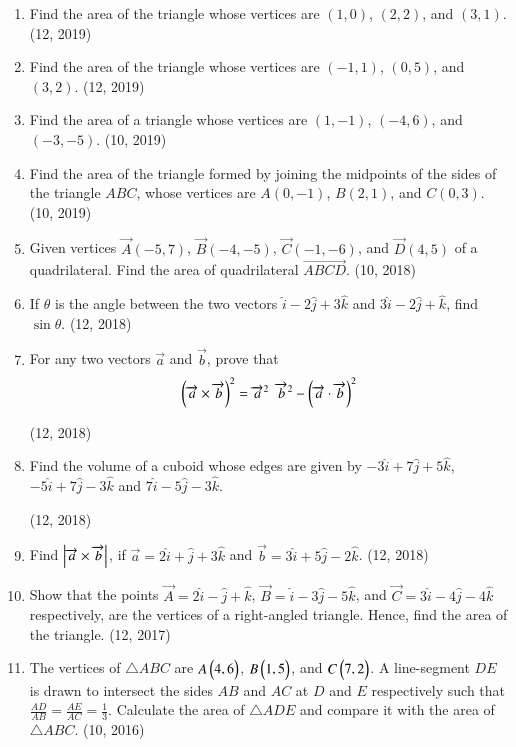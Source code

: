 \begin{enumerate}[label=\thesubsection.\arabic*,ref=\thesubsection.\theenumi]
	\item Find the area of the triangle whose vertices are $(1, 0)$, $(2, 2)$, and $(3, 1)$. \hfill (12, 2019)
	\item Find the area of the triangle whose vertices are $(-1, 1)$, $(0, 5)$, and $(3, 2)$. \hfill (12, 2019)
\item Find the area of a triangle whose vertices are $(1, -1)$, $(-4, 6)$, and $(-3, -5)$. \hfill (10, 2019)
\item Find the area of the triangle formed by joining the midpoints of the sides of the triangle $ABC$, whose vertices are $A(0, -1)$, $B(2, 1)$, and $C(0, 3)$. \hfill (10, 2019)
    \item Given vertices $\vec{A}(-5,7)$, $\vec{B}(-4,-5)$, $\vec{C}(-1,-6)$, and $\vec{D}(4,5)$ of a quadrilateral. Find the area of quadrilateral $\vec{ABCD}$. \hfill (10, 2018)
\item If $\theta$ is the angle between the two vectors $\hat{i} - 2\hat{j} + 3\hat{k}$ and $3\hat{i} - 2\hat{j} + \hat{k}$, find $\sin \theta$. \hfill (12, 2018)
\item For any two vectors $\overrightarrow{a}$ and $\overrightarrow{b}$, prove that
    \begin{align*}
    \left({\overrightarrow{a} \times \overrightarrow{b}}\right)^{2} = {\overrightarrow{a}^{2}}~~{\overrightarrow{b}^{2}} - \left({\overrightarrow{a} \cdot \overrightarrow{b}}\right)^{2} 
    \end{align*}

\hfill (12, 2018) 
\item Find the volume of a cuboid whose edges are given by $-3\hat{i}+7\hat{j}+5\hat{k}$,$-5\hat{i}+7\hat{j}-3\hat{k}$ and $7\hat{i}-5\hat{j}-3\hat{k}$.

\hfill (12, 2018) 
\item Find $\left\vert\overrightarrow{a} \times \overrightarrow{b}\right\vert$, if $\overrightarrow{a}=2\hat{i}+\hat{j}+3\hat{k}$ and $\overrightarrow{b}=3\hat{i}+5\hat{j}-2\hat{k}$.
\hfill (12, 2018) 
    \item Show that the points $\vec{A} = 2\hat{i} - \hat{j} + \hat{k}$, $\vec{B} = \hat{i} - 3\hat{j} - 5\hat{k}$, and $\vec{C} = 3\hat{i} - 4\hat{j} - 4\hat{k}$ respectively, are the vertices of a right-angled triangle. Hence, find the area of the triangle. \hfill (12, 2017)
    \item The vertices of $\triangle ABC$ are $A \begin{pmatrix}4, 6\end{pmatrix}$, $B \begin{pmatrix}1, 5\end{pmatrix}$, and $C \begin{pmatrix}7, 2\end{pmatrix}$. A line-segment $DE$ is drawn to intersect the sides $AB$ and $AC$ at $D$ and $E$ respectively such that $\frac{AD}{AB} = \frac{AE}{AC} = \frac{1}{3}$. Calculate the area of $\triangle ADE$ and compare it with the area of $\triangle ABC$. \hfill (10, 2016)
\end{enumerate}

